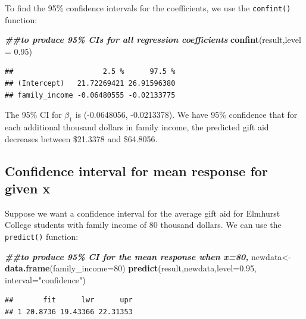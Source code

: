 \documentclass[
]{book}
\newenvironment{Shaded}{\begin{snugshade}}{\end{snugshade}}
\newcommand{\AttributeTok}[1]{\textcolor[rgb]{0.13,0.29,0.53}{#1}}
\newcommand{\DecValTok}[1]{\textcolor[rgb]{0.00,0.00,0.81}{#1}}
\newcommand{\DocumentationTok}[1]{\textcolor[rgb]{0.56,0.35,0.01}{\textbf{\textit{#1}}}}
\newcommand{\FloatTok}[1]{\textcolor[rgb]{0.00,0.00,0.81}{#1}}
\newcommand{\FunctionTok}[1]{\textcolor[rgb]{0.13,0.29,0.53}{\textbf{#1}}}
\newcommand{\NormalTok}[1]{#1}
\newcommand{\OtherTok}[1]{\textcolor[rgb]{0.56,0.35,0.01}{#1}}
\newcommand{\StringTok}[1]{\textcolor[rgb]{0.31,0.60,0.02}{#1}}
\begin{document}
To find the 95\% confidence intervals for the coefficients, we use the \texttt{confint()} function:

\begin{Shaded}
\begin{Highlighting}[]
\DocumentationTok{\#\#to produce 95\% CIs for all regression coefficients}
\FunctionTok{confint}\NormalTok{(result,}\AttributeTok{level =} \FloatTok{0.95}\NormalTok{)}
\end{Highlighting}
\end{Shaded}

\begin{verbatim}
##                     2.5 %      97.5 %
## (Intercept)   21.72269421 26.91596380
## family_income -0.06480555 -0.02133775
\end{verbatim}

The 95\% CI for \(\beta_1\) is (-0.0648056, -0.0213378). We have 95\% confidence that for each additional thousand dollars in family income, the predicted gift aid decreases between \$21.3378 and \$64.8056.

\hypertarget{confidence-interval-for-mean-response-for-given-x}{%
\subsection*{Confidence interval for mean response for given x}\label{confidence-interval-for-mean-response-for-given-x}}

Suppose we want a confidence interval for the average gift aid for Elmhurst College students with family income of 80 thousand dollars. We can use the \texttt{predict()} function:

\begin{Shaded}
\begin{Highlighting}[]
\DocumentationTok{\#\#to produce 95\% CI for the mean response when x=80, }
\NormalTok{newdata}\OtherTok{\textless{}{-}}\FunctionTok{data.frame}\NormalTok{(}\AttributeTok{family\_income=}\DecValTok{80}\NormalTok{)}
\FunctionTok{predict}\NormalTok{(result,newdata,}\AttributeTok{level=}\FloatTok{0.95}\NormalTok{, }\AttributeTok{interval=}\StringTok{"confidence"}\NormalTok{)}
\end{Highlighting}
\end{Shaded}

\begin{verbatim}
##       fit      lwr      upr
## 1 20.8736 19.43366 22.31353
\end{verbatim}
\end{document}
